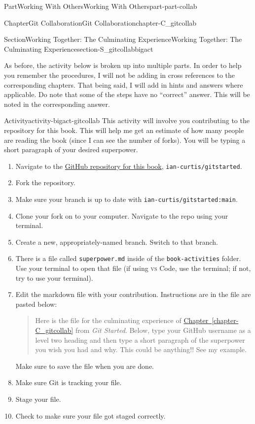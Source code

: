 \documentclass[oneside,10pt,]{book}
\newcommand{\xreffont}{\relax}
\newcommand{\mono}[1]{\texttt{#1}}
\newcommand{\initialism}[1]{\textsc{\MakeLowercase{#1}}}
\newcommand{\pubtitle}[1]{\textsl{#1}}
\begin{document}
\begin{partptx}{Part}{Working With Others}{}{Working With Others}{}{}{part-part-collab}
\begin{chapterptx}{Chapter}{Git Collaboration}{}{Git Collaboration}{}{}{chapter-C_gitcollab}
\begin{sectionptx}{Section}{Working Together: The Culminating Experience}{}{Working Together: The Culminating Experience}{}{}{section-S_gitcollabbigact}
\par
As before, the activity below is broken up into multiple parts. In order to help you remember the procedures, I will not be adding in cross references to the corresponding chapters. That being said, I will add in hints and answers where applicable. Do note that some of the steps have no “correct” answer. This will be noted in the corresponding answer.%
\begin{activity}{Activity}{}{activity-bigact-gitcollab}%
This activity will involve you contributing to the repository for this book. This will help me get an estimate of how many people are reading the book (since I can see the number of forks). You will be typing a short paragraph of your desired superpower.%
\begin{enumerate}[font=\bfseries,label=(\alph*),ref=\alph*]%
\item{}Navigate to the \href{https://github.com/ian-curtis/gitstarted}{GitHub repository for this book}\footnotemark{}, \mono{ian-curtis/gitstarted}.%
\item{}Fork the repository.%
\item{}Make sure your branch is up to date with \mono{ian-curtis/gitstarted:main}.%
\item{}Clone your fork on to your computer. Navigate to the repo using your terminal.%
\item{}Create a new, appropriately-named branch. Switch to that branch.%
\item{}There is a file called \mono{superpower.md} inside of the \mono{book-activities} folder. Use your terminal to open that file (if using \initialism{VS} Code, use the terminal; if not, try to use your terminal).%
\item{}Edit the markdown file with your contribution. Instructions are in the file are pasted below:%
\begin{quote}%
Here is the file for the culminating experience of \hyperref[chapter-C_gitcollab]{Chapter~{\xreffont\ref{chapter-C_gitcollab}}} from \pubtitle{Git Started}. Below, type your GitHub username as a level two heading and then type a short paragraph of the superpower you wish you had and why. This could be anything!! See my example.%
\end{quote}
Make sure to save the file when you are done.%
\item{}Make sure Git is tracking your file.%
\item{}Stage your file.%
\item{}Check to make sure your file got staged correctly.%

\end{enumerate}
\end{activity}
\end{sectionptx}
\end{chapterptx}
\end{partptx}
\end{document}
